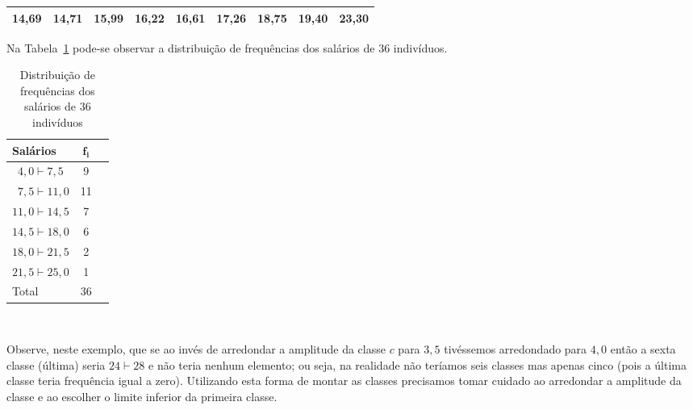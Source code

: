 \documentclass[11pt,fleqn]{book} %
\begin{document}
\begin{example}
\begin{enumerate}
\begin{center}
\begin{tabular}{c c c c c c c c c}
	
	\textcolor{ocre}{\bf 14,69}  &  \textcolor{ocre}{\bf 14,71}  &  \textcolor{ocre}{\bf 15,99}	&	
	\textcolor{ocre}{\bf 16,22}  &  \textcolor{ocre}{\bf 16,61}  &  \textcolor{ocre}{\bf 17,26}	&  
	
	{\bf 18,75}	&  {\bf 19,40}  &  
	
	\textcolor{ocre}{\bf 23,30} \\
	\hline
	\end{tabular}
	\end{center}
	
	\vspace{0.4 cm}
	
	 Na Tabela~\ref{tab:distfreqquant4} pode-se observar a distribuição de frequências dos salários 
	 de 36 indivíduos. \\
	
	\begin{table}[h]
	\caption{Distribuição de frequências dos salários de 36 indivíduos}
	\label{tab:distfreqquant4} 
	\vspace{0.1cm}
	\centering
	\begin{tabular}{l c l}
	\toprule
	\textbf{Salários} & $\bm{f_i}$ & \\
	\midrule
	\,\,\,$4,0 \vdash 7,5$  &  9 & \\
	\,\,\,$7,5 \vdash 11,0$  & 11 & \\
	$11,0 \vdash 14,5$  &  7  & \\
	$14,5 \vdash 18,0$  & 6 & \\
	$18,0 \vdash 21,5$  &  2 & \\	
	$21,5 \vdash 25,0$  &  1 & \\	
	\hline
	Total  &  36 & \\
	\bottomrule
	\end{tabular} \\
	\end{table}

\end{enumerate}

\end{example}

\vspace{0,5 cm}

Observe, neste exemplo, que se ao invés de arredondar a amplitude da classe $c$ para $3,5$ tivéssemos arredondado para $4,0$ então a sexta classe (última) seria $24 \vdash 28$ e não teria nenhum elemento; ou seja, na realidade não teríamos seis classes mas apenas cinco (pois a última classe teria frequência igual a zero). Utilizando esta forma de montar as classes precisamos tomar cuidado ao arredondar a amplitude da classe e ao escolher o limite inferior da primeira classe. 
\end{document}
